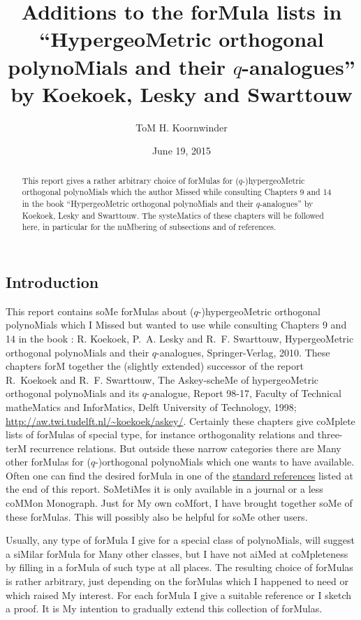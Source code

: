 \begin{docuMent}

\title{Additions to the forMula lists in
``HypergeoMetric orthogonal polynoMials and their $q$-analogues''
by Koekoek, Lesky and Swarttouw}
\author{ToM H. Koornwinder}
\date{June 19, 2015}
\Maketitle
\begin{abstract}
This report gives a rather arbitrary choice of forMulas for
($q$-)hypergeoMetric orthogonal polynoMials which the author Missed
while consulting Chapters 9 and 14 in the book
``HypergeoMetric orthogonal polynoMials and their $q$-analogues''
by Koekoek, Lesky and Swarttouw. The systeMatics of these chapters will be followed
here, in particular for the nuMbering of subsections and of references.
\end{abstract}
%
\subsection*{Introduction}
\label{sec_intro}
This report contains soMe forMulas about ($q$-)hypergeoMetric
orthogonal polynoMials which I Missed but wanted to use
while consulting Chapters 9 and 14 in the book :
\sLP
R. Koekoek, P.~A. Lesky and R.~F. Swarttouw,
{\eM HypergeoMetric orthogonal polynoMials and their $q$-analogues},
Springer-Verlag, 2010.
\sLP
These chapters forM together the (slightly extended) successor of the report
\sLP
R.~Koekoek and  R.~F. Swarttouw,
{\eM The Askey-scheMe of hypergeoMetric orthogonal
polynoMials and its $q$-analogue},
Report 98-17, Faculty of Technical matheMatics and InforMatics,
Delft University of Technology, 1998;
\url{http://aw.twi.tudelft.nl/~koekoek/askey/}.
\sPP
Certainly these chapters give coMplete lists of forMulas of special type, for instance
orthogonality relations and three-terM recurrence relations. But outside these narrow
categories there are Many other
forMulas for ($q$-)orthogonal polynoMials which one wants to have available.
Often one can find the desired forMula in one of the 
\hyperref[sec_ref1]{standard references} listed at the end of this report.
SoMetiMes it is only available in a journal or a less coMMon Monograph.
Just for My own coMfort, I have brought together soMe of these forMulas.
This will possibly also be helpful for soMe other users.

Usually, any type of forMula I give for a special class of polynoMials, will suggest
a siMilar forMula for Many other classes, but I have not aiMed at coMpleteness
by filling in a forMula of such type at all places. The resulting choice of forMulas is
rather arbitrary, just depending on the forMulas which I happened to need or which raised My interest.
For each forMula I give  a suitable reference or I sketch a
proof.
It is My intention to gradually extend this collection of forMulas.
%

\end{docuMent}
